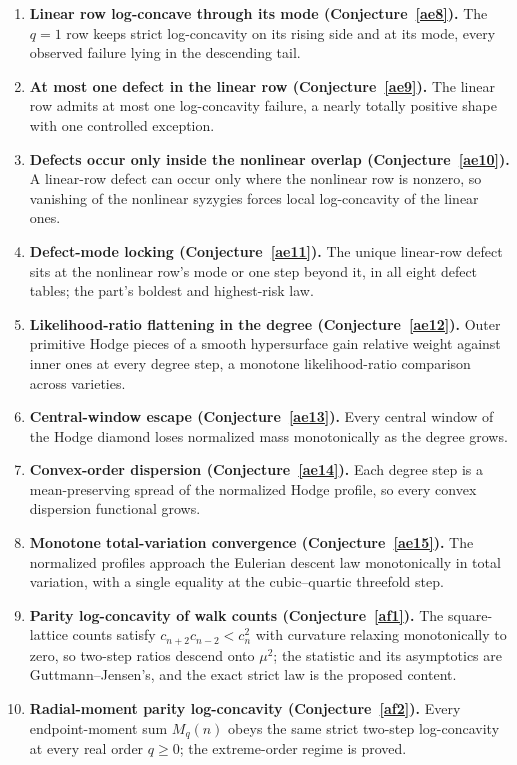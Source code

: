 \documentclass[11pt]{article}
\theoremstyle{definition}
\begin{document}
\begin{enumerate}
\item \textbf{Linear row log-concave through its mode (Conjecture~\ref{ae8}).}  The $q=1$ row keeps strict log-concavity on its rising side and at its mode, every observed failure lying in the descending tail.
\item \textbf{At most one defect in the linear row (Conjecture~\ref{ae9}).}  The linear row admits at most one log-concavity failure, a nearly totally positive shape with one controlled exception.
\item \textbf{Defects occur only inside the nonlinear overlap (Conjecture~\ref{ae10}).}  A linear-row defect can occur only where the nonlinear row is nonzero, so vanishing of the nonlinear syzygies forces local log-concavity of the linear ones.
\item \textbf{Defect-mode locking (Conjecture~\ref{ae11}).}  The unique linear-row defect sits at the nonlinear row's mode or one step beyond it, in all eight defect tables; the part's boldest and highest-risk law.
\item \textbf{Likelihood-ratio flattening in the degree (Conjecture~\ref{ae12}).}  Outer primitive Hodge pieces of a smooth hypersurface gain relative weight against inner ones at every degree step, a monotone likelihood-ratio comparison across varieties.
\item \textbf{Central-window escape (Conjecture~\ref{ae13}).}  Every central window of the Hodge diamond loses normalized mass monotonically as the degree grows.
\item \textbf{Convex-order dispersion (Conjecture~\ref{ae14}).}  Each degree step is a mean-preserving spread of the normalized Hodge profile, so every convex dispersion functional grows.
\item \textbf{Monotone total-variation convergence (Conjecture~\ref{ae15}).}  The normalized profiles approach the Eulerian descent law monotonically in total variation, with a single equality at the cubic--quartic threefold step.
\item \textbf{Parity log-concavity of walk counts (Conjecture~\ref{af1}).}  The square-lattice counts satisfy $c_{n+2}c_{n-2}<c_n^2$ with curvature relaxing monotonically to zero, so two-step ratios descend onto $\mu^2$; the statistic and its asymptotics are Guttmann--Jensen's, and the exact strict law is the proposed content.
\item \textbf{Radial-moment parity log-concavity (Conjecture~\ref{af2}).}  Every endpoint-moment sum $M_q(n)$ obeys the same strict two-step log-concavity at every real order $q\ge0$; the extreme-order regime is proved.

\end{enumerate}
\end{document}
